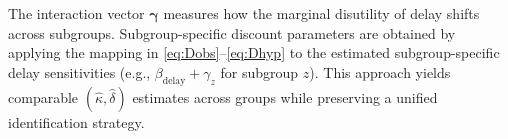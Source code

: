 The interaction vector $\boldsymbol{\gamma}$ measures how the marginal disutility of delay shifts across subgroups. Subgroup-specific discount parameters are obtained by applying the mapping in \eqref{eq:Dobs}--\eqref{eq:Dhyp} to the estimated subgroup-specific delay sensitivities (e.g., $\beta_{\text{delay}}+\gamma_z$ for subgroup $z$). This approach yields comparable $(\hat{\kappa},\hat{\delta})$ estimates across groups while preserving a unified identification strategy.
